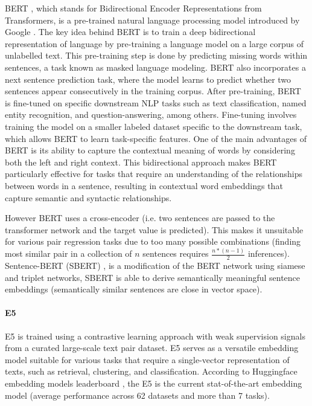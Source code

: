 \documentclass[a4paper,12pt]{article}
\begin{document}
BERT \cite{bert}, which stands for Bidirectional Encoder Representations from Transformers, is a pre-trained natural language processing model introduced by Google \cite{bert}.
The key idea behind BERT is to train a deep bidirectional representation of language by pre-training a language model on a large corpus of unlabelled text. This pre-training step is done by predicting missing words within sentences, a task known as masked language modeling. 
BERT also incorporates a next sentence prediction task, where the model learns to predict whether two sentences appear consecutively in the training corpus.
After pre-training, BERT is fine-tuned on specific downstream NLP tasks such as text classification, named entity recognition, and question-answering, among others. 
Fine-tuning involves training the model on a smaller labeled dataset specific to the downstream task, which allows BERT to learn task-specific features.
One of the main advantages of BERT is its ability to capture the contextual meaning of words by considering both the left and right context. 
This bidirectional approach makes BERT particularly effective for tasks that require an understanding of the relationships between words in a sentence, resulting in contextual word embeddings that capture semantic and syntactic relationships.

However BERT \cite{bert} uses a cross-encoder (i.e. two sentences are passed to the transformer network and the target value is predicted). This makes it unsuitable for various pair regression tasks due to too many possible combinations (finding most similar pair in a collection of $n$ sentences requires $\frac{n*(n-1)}{2}$ inferences). Sentence-BERT (SBERT) \cite{sbert}, is a modification of the BERT network using siamese and triplet networks, SBERT is able to
derive semantically meaningful sentence embeddings (semantically similar sentences are close in vector space).

\paragraph{E5}
E5 \cite{e5} is trained using a contrastive learning approach with weak supervision signals from a curated large-scale text pair dataset. 
E5 serves as a versatile embedding model suitable for various tasks that require a single-vector representation of texts, such as retrieval, clustering, and classification. 
According to Huggingface embedding models leaderboard \cite{embedding-leaderboard}, the E5 \cite{e5} is the current stat-of-the-art embedding model (average performance across 62 datasets and more than 7 tasks).
\end{document}
